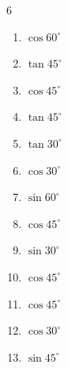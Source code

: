 \begin{multicols}{6}
\begin{enumerate}
  \item $\displaystyle \cos{60^\circ}$


  \item $\displaystyle \tan{45^\circ}$

        \phantom{$\displaystyle =1$}

  \item $\displaystyle \cos{45^\circ}$


  \item $\displaystyle \tan{45^\circ}$

        \phantom{$\displaystyle =1$}

  \item $\displaystyle \tan{30^\circ}$


  \item $\displaystyle \cos{30^\circ}$


  \item $\displaystyle \sin{60^\circ}$


  \item $\displaystyle \cos{45^\circ}$


  \item $\displaystyle \sin{30^\circ}$


  \item $\displaystyle \cos{45^\circ}$


  \item $\displaystyle \cos{45^\circ}$


  \item $\displaystyle \cos{30^\circ}$


\columnbreak %

  \item $\displaystyle \sin{45^\circ}$


\end{enumerate}
\end{multicols}

